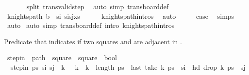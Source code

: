 \begin{isabellebody}
\ \ \ \ \isamarkupfalse%
\ {}\ split\ trans{\isacharunderscore}{\kern0pt}valid{\isacharunderscore}{\kern0pt}step\ \isamarkupfalse%
\ {\isacharparenleft}{\kern0pt}auto\ simp{\isacharcolon}{\kern0pt}\ trans{\isacharunderscore}{\kern0pt}board{\isacharunderscore}{\kern0pt}def{\isacharparenright}{\kern0pt}\isanewline
\ \ \isamarkupfalse%
\ \isamarkupfalse%
\ {\isachardoublequoteopen}knights{\isacharunderscore}{\kern0pt}path\ {\isacharparenleft}{\kern0pt}{\isacharquery}{\kern0pt}b\ {\isasymunion}\ {\isacharbraceleft}{\kern0pt}{\isacharquery}{\kern0pt}s\isactrlsub i{\isacharbraceright}{\kern0pt}{\isacharparenright}{\kern0pt}\ {\isacharparenleft}{\kern0pt}{\isacharquery}{\kern0pt}s\isactrlsub i{\isacharhash}{\kern0pt}{\isacharquery}{\kern0pt}s\isactrlsub j{\isacharhash}{\kern0pt}{\isacharquery}{\kern0pt}xs{\isacharparenright}{\kern0pt}{\isachardoublequoteclose}\isanewline
\ \ \ \ \isamarkupfalse%
\ knights{\isacharunderscore}{\kern0pt}path{\isachardot}{\kern0pt}intros\ \isamarkupfalse%
\ auto\isanewline
\ \ \isamarkupfalse%
\ \isamarkupfalse%
\ {\isacharquery}{\kern0pt}case\ \isamarkupfalse%
\ simps\ \isamarkupfalse%
\ auto\isanewline
{}\isamarkupfalse%
\ {\isacharparenleft}{\kern0pt}auto\ simp{\isacharcolon}{\kern0pt}\ trans{\isacharunderscore}{\kern0pt}board{\isacharunderscore}{\kern0pt}def\ intro{\isacharcolon}{\kern0pt}\ knights{\isacharunderscore}{\kern0pt}path{\isachardot}{\kern0pt}intros{\isacharparenright}{\kern0pt}%
\endisatagproof
{\isafoldproof}%
%
\isadelimproof
%
\endisadelimproof
%
\begin{isamarkuptext}%
Predicate that indicates if two squares  and  are adjacent in .%
\end{isamarkuptext}\isamarkuptrue%
\isamarkupfalse%
\ step{\isacharunderscore}{\kern0pt}in\ {\isacharcolon}{\kern0pt}{\isacharcolon}{\kern0pt}\ {\isachardoublequoteopen}path\ {\isasymRightarrow}\ square\ {\isasymRightarrow}\ square\ {\isasymRightarrow}\ bool{\isachardoublequoteclose}\ \isanewline
\ \ {\isachardoublequoteopen}step{\isacharunderscore}{\kern0pt}in\ ps\ s\isactrlsub i\ s\isactrlsub j\ {\isasymequiv}\ {\isacharparenleft}{\kern0pt}{\isasymexists}k{\isachardot}{\kern0pt}\ {}\ {\isacharless}{\kern0pt}\ k\ {\isasymand}\ k\ {\isacharless}{\kern0pt}\ length\ ps\ {\isasymand}\ last\ {\isacharparenleft}{\kern0pt}take\ k\ ps{\isacharparenright}{\kern0pt}\ {\isacharequal}{\kern0pt}\ s\isactrlsub i\ {\isasymand}\ hd\ {\isacharparenleft}{\kern0pt}drop\ k\ ps{\isacharparenright}{\kern0pt}\ {\isacharequal}{\kern0pt}\ s\isactrlsub j{\isacharparenright}{\kern0pt}{\isachardoublequoteclose}\isanewline

\end{isabellebody}
